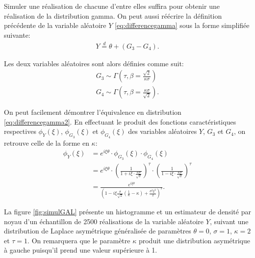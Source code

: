 Simuler une réalisation de chacune d'entre elles suffira pour obtenir
une réalisation de la distribution gamma. On peut aussi réécrire la
définition précédente de la variable aléatoire $Y$
\eqref{eq:differencegamma} sous la forme simplifiée suivante:
\begin{align}
  \label{eq:differencegamma2}
  Y \stackrel{d}{=} \theta + \left(G_3-G_4 \right).
\end{align}

Les deux variables aléatoires sont alors définies comme suit:
\begin{align*}
  G_3 \sim \Gamma\left(\tau,\beta=\frac{\sqrt{2}}{\kappa\sigma} \right)\\
  G_4 \sim \Gamma\left(\tau,\beta=\frac{\kappa\sigma}{\sqrt{2}}
  \right).
\end{align*}

On peut facilement démontrer l'équivalence en distribution
\eqref{eq:differencegamma2}. En effectuant le produit des fonctions
caractéristiques respectives $\phi_{Y}(\xi)$, $\phi_{G_3}(\xi)$ et
$\phi_{G_4}(\xi)$ des variables aléatoires $Y$, $G_3$ et $G_4$, on
retrouve celle de la forme en $\kappa$:
\begin{align}
  \label{eq:equivalence2gammaFC}
  \phi_{Y}(\xi) &= e^{i\xi\theta} \cdot \phi_{G_3}(\xi) \cdot \phi_{G_4}(\xi) \nonumber\\
  &= e^{i\xi\theta} \cdot \left(\frac{1}{1+i\xi\cdot\frac{\kappa\sigma}{\sqrt{2}}}\right)^{\tau} \cdot \left(\frac{1}{1-i\xi\cdot\frac{\kappa\sigma}{\sqrt{2}}}\right)^{\tau} \nonumber\\
  &=
  \frac{e^{i\xi\theta}}{\left(1-i\xi\frac{\sigma}{\sqrt{2}}\left(\frac{1}{\kappa}-\kappa
      \right) + \frac{\sigma^2\xi^2}{2}\right)^{\tau}}.
\end{align}

La figure \ref{fig:simulGAL} présente un histogramme et un estimateur
de densité par noyau d'un échantillon de 2500 réalisations de la
variable aléatoire $Y$, suivant une distribution de Laplace
asymétrique généralisée de paramètres $\theta=0$, $\sigma=1$,
$\kappa=2$ et $\tau=1$. On remarquera que le paramètre $\kappa$
produit une distribution asymétrique à gauche puisqu'il prend une
valeur supérieure à 1.

